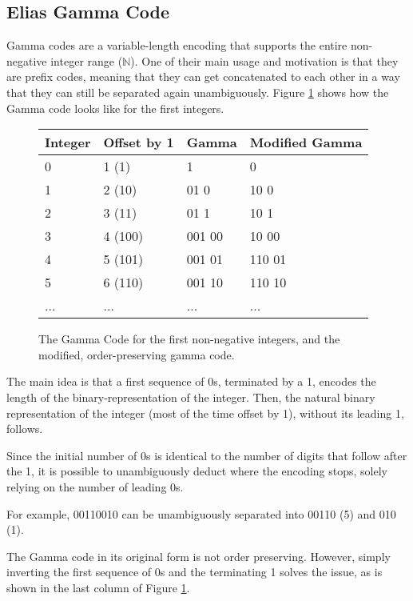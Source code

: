 \documentclass{acm_proc_article-sp}
\begin{document}
\subsection{Elias Gamma Code}
\label{section-gamma-code}

Gamma codes are a variable-length encoding that supports the entire non-negative integer range ($\mathbb{N}$). One of their main usage and motivation is that they are prefix codes, meaning that they can get concatenated to each other in a way that they can still be separated again unambiguously. Figure \ref{figure-gamma-encoding} shows how the Gamma code looks like for the first integers.

\begin{figure}[p]
\caption{The Gamma Code for the first non-negative integers, and the modified, order-preserving gamma code.}
\label{figure-gamma-encoding}
\center
\begin{tabular}{|l|l|l|l|}
\hline
Integer & Offset by 1 & Gamma & Modified Gamma \\
\hline
0 & 1 (1) & 1 & 0\\
\hline
1 & 2 (10) & 01 0 & 10 0 \\
\hline
2 & 3 (11) & 01 1  & 10 1\\
\hline
3 & 4 (100) & 001 00 & 10 00\\
\hline
4 & 5 (101) & 001 01 & 110 01\\
\hline
5 & 6 (110) & 001 10 & 110 10\\
\hline
... & ... & ... & ... \\
\hline
\end{tabular}
\end{figure}

 The main idea is that a first sequence of 0s, terminated by a 1, encodes the length of the binary-representation of the integer. Then, the natural binary representation of the integer (most of the time offset by 1), without its leading 1, follows.

Since the initial number of 0s is identical to the number of digits that follow after the 1, it is possible to unambiguously deduct where the encoding stops, solely relying on the number of leading 0s.

For example, 00110010 can be unambiguously separated into 00110 (5) and 010 (1).

The Gamma code in its original form is not order preserving. However, simply inverting the first sequence of 0s and the terminating 1 solves the issue, as is shown in the last column of Figure \ref{figure-gamma-encoding}.
\end{document}
